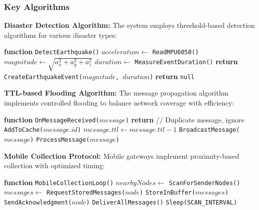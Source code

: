 \documentclass[conference]{IEEEtran}
\begin{document}
\subsubsection{Key Algorithms}

\textbf{Disaster Detection Algorithm:}  
The system employs threshold-based detection algorithms for various disaster types:

\begin{algorithmic}[1]
\STATE \textbf{function} \texttt{DetectEarthquake()}
\STATE $acceleration \gets$ \texttt{ReadMPU6050()}
\STATE $magnitude \gets \sqrt{a_x^2 + a_y^2 + a_z^2}$
    \STATE $duration \gets$ \texttt{MeasureEventDuration()}
    \STATE \textbf{return} \texttt{CreateEarthquakeEvent($magnitude$, $duration$)}
\ENDIF
\STATE \textbf{return} \texttt{null}
\end{algorithmic}

\vspace{0.5em}
\textbf{TTL-based Flooding Algorithm:}  
The message propagation algorithm implements controlled flooding to balance network coverage with efficiency:

\begin{algorithmic}[1]
\STATE \textbf{function} \texttt{OnMessageReceived($message$)}
    \STATE \textbf{return} // Duplicate message, ignore
\ENDIF
\STATE \texttt{AddToCache($message.id$)}
    \STATE $message.ttl \gets message.ttl - 1$
    \STATE \texttt{BroadcastMessage($message$)}
\ENDIF
\STATE \texttt{ProcessMessage($message$)}
\end{algorithmic}

\vspace{0.5em}
\textbf{Mobile Collection Protocol:}  
Mobile gateways implement proximity-based collection with optimized timing:

\begin{algorithmic}[1]
\STATE \textbf{function} \texttt{MobileCollectionLoop()}
    \STATE $nearbyNodes \gets$ \texttt{ScanForSenderNodes()}
        \STATE $messages \gets$ \texttt{RequestStoredMessages($node$)}
        \STATE \texttt{StoreInBuffer($messages$)}
        \STATE \texttt{SendAcknowledgment($node$)}
    \ENDFOR
        \STATE \texttt{DeliverAllMessages()}
    \ENDIF
    \STATE \texttt{Sleep(SCAN\_INTERVAL)}
\ENDWHILE
\end{algorithmic}
\end{document}

